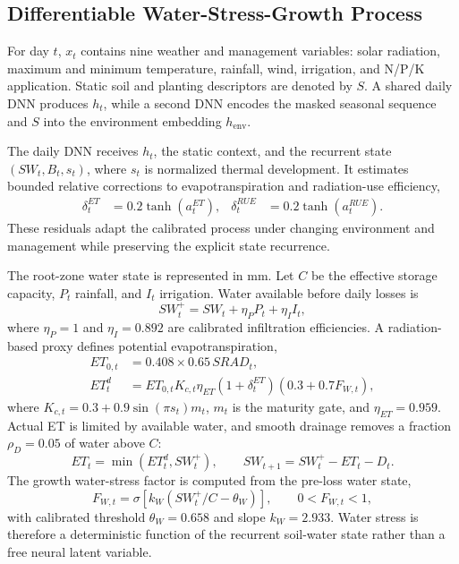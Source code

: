 \documentclass{article}
\begin{document}
\subsection{Differentiable Water-Stress-Growth Process}
For day $t$, $x_t$ contains nine weather and management variables: solar radiation, maximum and minimum temperature, rainfall, wind, irrigation, and N/P/K application. Static soil and planting descriptors are denoted by $S$. A shared daily DNN produces $h_t$, while a second DNN encodes the masked seasonal sequence and $S$ into the environment embedding $h_{\mathrm{env}}$.

The daily DNN receives $h_t$, the static context, and the recurrent state $(SW_t,B_t,s_t)$, where $s_t$ is normalized thermal development. It estimates bounded relative corrections to evapotranspiration and radiation-use efficiency,
\begin{align}
 \delta_t^{ET}&=0.2\tanh(a_t^{ET}), &
 \delta_t^{RUE}&=0.2\tanh(a_t^{RUE}).
 \label{eq:corrections}
\end{align}
These residuals adapt the calibrated process under changing environment and management while preserving the explicit state recurrence.

The root-zone water state is represented in mm. Let $C$ be the effective storage capacity, $P_t$ rainfall, and $I_t$ irrigation. Water available before daily losses is
\begin{equation}
 SW_t^{+}=SW_t+\eta_P P_t+\eta_I I_t,
 \label{eq:water}
\end{equation}
where $\eta_P=1$ and $\eta_I=0.892$ are calibrated infiltration efficiencies. A radiation-based proxy defines potential evapotranspiration,
\begin{align}
 ET_{0,t}&=0.408\times0.65\,SRAD_t,\\
 ET_t^{d}&=ET_{0,t}K_{c,t}\eta_{ET}(1+\delta_t^{ET})
 \left(0.3+0.7F_{W,t}\right),
\end{align}
where $K_{c,t}=0.3+0.9\sin(\pi s_t)m_t$, $m_t$ is the maturity gate, and $\eta_{ET}=0.959$. Actual ET is limited by available water, and smooth drainage removes a fraction $\rho_D=0.05$ of water above $C$:
\begin{equation}
 ET_t=\min(ET_t^d,SW_t^{+}),\qquad
 SW_{t+1}=SW_t^{+}-ET_t-D_t.
 \label{eq:water_update}
\end{equation}
The growth water-stress factor is computed from the pre-loss water state,
\begin{equation}
 F_{W,t}=\sigma\!\left[k_W(SW_t^{+}/C-\theta_W)\right],
 \qquad 0<F_{W,t}<1,
 \label{eq:fw}
\end{equation}
with calibrated threshold $\theta_W=0.658$ and slope $k_W=2.933$. Water stress is therefore a deterministic function of the recurrent soil-water state rather than a free neural latent variable.
\end{document}
